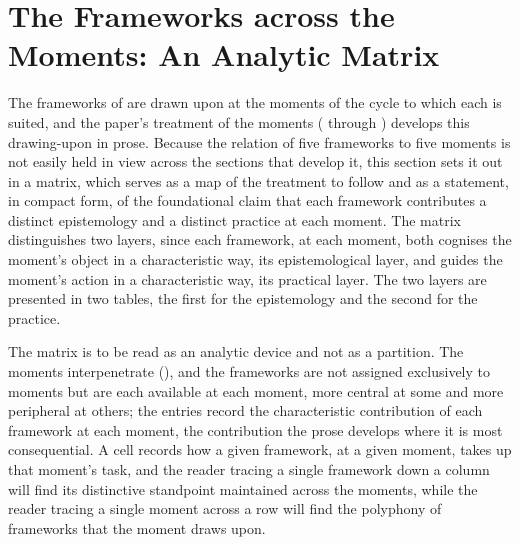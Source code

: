 \section{The Frameworks across the Moments: An Analytic Matrix}
\label{p11:sec:matrix}

\noindent
The frameworks of  are drawn upon at the moments of the cycle to which each is suited, and the paper's treatment of the moments ( through ) develops this drawing-upon in prose. Because the relation of five frameworks to five moments is not easily held in view across the sections that develop it, this section sets it out in a matrix, which serves as a map of the treatment to follow and as a statement, in compact form, of the foundational claim that each framework contributes a distinct epistemology and a distinct practice at each moment. The matrix distinguishes two layers, since each framework, at each moment, both cognises the moment's object in a characteristic way, its epistemological layer, and guides the moment's action in a characteristic way, its practical layer. The two layers are presented in two tables, the first for the epistemology and the second for the practice.

The matrix is to be read as an analytic device and not as a partition. The moments interpenetrate (), and the frameworks are not assigned exclusively to moments but are each available at each moment, more central at some and more peripheral at others; the entries record the characteristic contribution of each framework at each moment, the contribution the prose develops where it is most consequential. A cell records how a given framework, at a given moment, takes up that moment's task, and the reader tracing a single framework down a column will find its distinctive standpoint maintained across the moments, while the reader tracing a single moment across a row will find the polyphony of frameworks that the moment draws upon.

